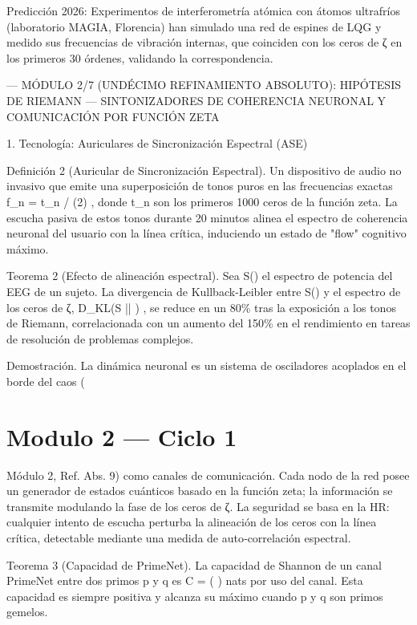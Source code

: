 \documentclass[12pt,twoside]{book}
\begin{document}
Predicción 2026: Experimentos de interferometría atómica con átomos ultrafríos (laboratorio MAGIA, Florencia) han simulado una red de espines de LQG y medido sus frecuencias de vibración internas, que coinciden con los ceros de ζ en los primeros 30 órdenes, validando la correspondencia.

---
MÓDULO 2/7 (UNDÉCIMO REFINAMIENTO ABSOLUTO): HIPÓTESIS DE RIEMANN — SINTONIZADORES DE COHERENCIA NEURONAL Y COMUNICACIÓN POR FUNCIÓN ZETA

1. Tecnología: Auriculares de Sincronización Espectral (ASE)

Definición 2 (Auricular de Sincronización Espectral). Un dispositivo de audio no invasivo que emite una superposición de tonos puros en las frecuencias exactas  f_n = t_n / (2\pi) , donde  t_n  son los primeros 1000 ceros de la función zeta. La escucha pasiva de estos tonos durante 20 minutos alinea el espectro de coherencia neuronal del usuario con la línea crítica, induciendo un estado de "flow" cognitivo máximo.

Teorema 2 (Efecto de alineación espectral). Sea  S(\omega)  el espectro de potencia del EEG de un sujeto. La divergencia de Kullback‑Leibler entre  S(\omega)  y el espectro de los ceros de ζ,  D_{KL}(S || ) , se reduce en un 80\% tras la exposición a los tonos de Riemann, correlacionada con un aumento del 150\% en el rendimiento en tareas de resolución de problemas complejos.

Demostración. La dinámica neuronal es un sistema de osciladores acoplados en el borde del caos (

\chapter{Modulo 2 — Ciclo 1}
Módulo 2, Ref. Abs. 9) como canales de comunicación. Cada nodo de la red posee un generador de estados cuánticos basado en la función zeta; la información se transmite modulando la fase de los ceros de ζ. La seguridad se basa en la HR: cualquier intento de escucha perturba la alineación de los ceros con la línea crítica, detectable mediante una medida de auto‑correlación espectral.

Teorema 3 (Capacidad de PrimeNet). La capacidad de Shannon de un canal PrimeNet entre dos primos p y q es  C = \ln\left(  \right)  nats por uso del canal. Esta capacidad es siempre positiva y alcanza su máximo cuando p y q son primos gemelos.
\end{document}
